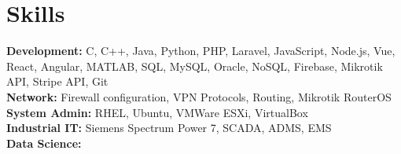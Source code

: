 \section*{Skills}
\small{
    \noindent\textbf{Development:} C, C++, Java, Python, PHP, Laravel, JavaScript, Node.js, Vue, React, Angular, MATLAB, SQL, MySQL, Oracle, NoSQL, Firebase, Mikrotik API, Stripe API, Git \\ 
    \noindent\textbf{Network:} Firewall configuration, VPN Protocols, Routing, Mikrotik RouterOS \\
    \noindent\textbf{System Admin:} RHEL, Ubuntu, VMWare ESXi, VirtualBox \\ 
    \noindent\textbf{Industrial IT:} Siemens Spectrum Power 7, SCADA, ADMS, EMS \\ 
    \noindent\textbf{Data Science:} \\ 
}